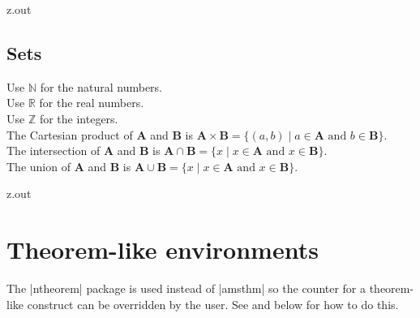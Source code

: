 \begin{VerbatimOut}{z.out}

\subsection{Sets}

{
  \newcommand{\Se}[1]{\ensuremath{\mathbf #1}}
  \newcommand{\St}{\mid}
  \noindent
  Use \(\mathbb{N}\) for the natural numbers.
  \\
  Use \(\mathbb{R}\) for the real numbers.
  \\
  Use \(\mathbb{Z}\) for the integers.
  \\
  The Cartesian product\index{\verb+\times+}
  of \Se A and \Se B is
  \(\Se A \times \Se B = \{(a,b) \St a \in \Se A \text{ and } b \in \Se B\}\).\\
  The intersection\index{\verb+\cap+}
  of \Se A and \Se B is
  \(\Se A \cap \Se B = \{ x \St x \in \Se A \text{ and } x \in \Se B\}\).\\
  The union\index{\verb+\cup+}
  of \Se A and \Se B is
  \(\Se A \cup \Se B = \{ x \St x \in \Se A \text{ and } x \in \Se B\}\).
}
\end{VerbatimOut}

\MyIO


\begin{VerbatimOut}{z.out}


\section{Theorem-like environments}

The |ntheorem| package
is used instead of |amsthm|
so the counter
for a theorem-like construct
can be overridden by the user.
See
\cite[pages 4--5]{may2011}
and below
for how to do this.
\end{VerbatimOut}

\MyIO




